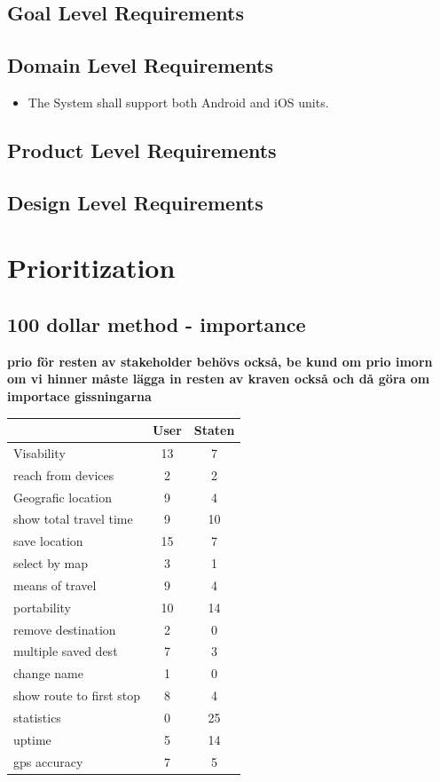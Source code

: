 \documentclass[a4paper]{article}
\begin{document}
		\subsection{Goal Level Requirements}
		\subsection{Domain Level Requirements}
		\begin{itemize}
			\item The System shall support both Android and iOS units.
		\end{itemize}
		\subsection{Product Level Requirements}
					
		\subsection{Design Level Requirements}	
	\section{Prioritization}
		\subsection{100 dollar method -  importance}
		\textbf{prio för resten av stakeholder behövs också, be kund om prio imorn om vi hinner}
		\textbf{måste lägga in resten av kraven också och då göra om importace gissningarna}
		\begin{tabular}{|l|c|c|}
			\hline
			&User	&Staten \\
			\hline			
			Visability	&13	&7 \\
			\hline
			reach from devices	&2	&2 \\
			\hline
			Geografic location	&9	&4 \\
			\hline
			show total travel time	&9	&10 \\
			\hline
			save location	&15	&7 \\
			\hline
			select by map	&3	&1 \\
			\hline
			means of travel	&9	&4 \\
			\hline
			portability	&10	&14 \\
			\hline
			remove destination	&2	&0 \\
			\hline
			multiple saved dest	&7	&3 \\
			\hline
			change name	&1	&0 \\
			\hline
			show route to first stop	&8	&4 \\
			\hline
			statistics	&0	&25 \\
			\hline
			uptime	&5	&14 \\
			\hline
			gps accuracy	&7	&5 \\
			\hline			
			
		\end{tabular}
\end{document}

